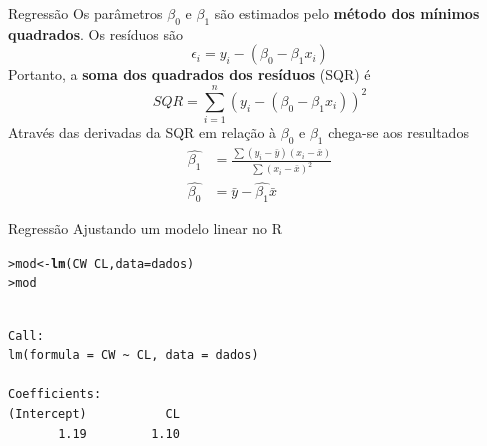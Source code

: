 \documentclass[10pt]{beamer}\usepackage[]{graphicx}\usepackage[]{color}
\makeatletter
\newcommand{\hlopt}[1]{\textcolor[rgb]{0,0,0}{#1}}%
\newcommand{\hlstd}[1]{\textcolor[rgb]{0.345,0.345,0.345}{#1}}%
\newcommand{\hlkwb}[1]{\textcolor[rgb]{0.69,0.353,0.396}{#1}}%
\newcommand{\hlkwc}[1]{\textcolor[rgb]{0.333,0.667,0.333}{#1}}%
\newcommand{\hlkwd}[1]{\textcolor[rgb]{0.282,0.239,0.545}{\textbf{#1}}}%
\newenvironment{kframe}{%
 \def\at@end@of@kframe{}%
 \ifinner\ifhmode%
  \def\at@end@of@kframe{\end{minipage}}%
  \begin{minipage}{\columnwidth}%
 \fi\fi%
 \def\FrameCommand##1{\hskip\@totalleftmargin \hskip-\fboxsep
 \colorbox{shadecolor}{##1}\hskip-\fboxsep
     \hskip-\linewidth \hskip-\@totalleftmargin \hskip\columnwidth}%
 \MakeFramed {\advance\hsize-\width
   \@totalleftmargin\z@ \linewidth\hsize
   \@setminipage}}%
 {\par\unskip\endMakeFramed%
 \at@end@of@kframe}
\newenvironment{knitrout}{}{} %
\providecommand{\R}{\textsf{R}\xspace}
\makeatother
\begin{document}
\begin{frame}[fragile=singleslide]{Regressão}
Os parâmetros $\beta_0$ e $\beta_1$ são estimados pelo \textbf{método dos
mínimos quadrados}. Os resíduos são
\begin{equation*}
  \epsilon_i = y_i - (\beta_0 - \beta_1 x_i)
\end{equation*}
Portanto, a \textbf{soma dos quadrados dos resíduos} (SQR) é
\begin{equation*}
  SQR = \sum_{i=1}^{n} (y_i - (\beta_0 - \beta_1 x_i))^2
\end{equation*}
Através das derivadas da SQR em relação à $\beta_0$ e $\beta_1$ chega-se
aos resultados
\begin{align*}
  \hat{\beta_1} &= \frac{\sum (y_i - \bar{y}) (x_i - \bar{x})}
  {\sum (x_i - \bar{x})^2} \\
  \hat{\beta_0} &= \bar{y} - \hat{\beta_1} \bar{x}
\end{align*}
\end{frame}

\begin{frame}[fragile=singleslide]{Regressão}
Ajustando um modelo linear no \R
\begin{knitrout}\small
{}\color{fgcolor}\begin{kframe}
\begin{alltt}
\hlstd{> }\hlstd{mod} \hlkwb{<-} \hlkwd{lm}\hlstd{(CW} \hlopt{~} \hlstd{CL,} \hlkwc{data} \hlstd{= dados)}
\hlstd{> }\hlstd{mod}
\end{alltt}
\begin{verbatim}

Call:
lm(formula = CW ~ CL, data = dados)

Coefficients:
(Intercept)           CL  
       1.19         1.10  
\end{verbatim}
\end{kframe}
\end{knitrout}

\end{frame}
\end{document}
